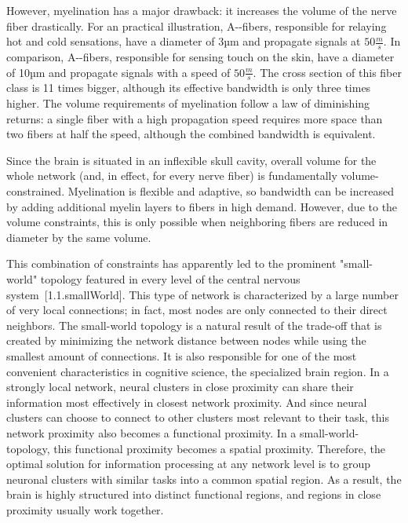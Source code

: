 However, myelination has a major drawback: it increases the volume of the nerve fiber drastically.
For an practical illustration, A-\gamma-fibers, responsible for relaying hot and cold sensations, have a diameter of 3µm and propagate signals at $50\frac{m}{s}$.
In comparison, A-\beta-fibers, responsible for sensing touch on the skin, have a diameter of 10µm and propagate signals with a speed of $50\frac{m}{s}$.
The cross section of this fiber class is 11 times bigger, although its effective bandwidth is only three times higher.
The volume requirements of myelination follow a law of diminishing returns: a single fiber with a high propagation speed requires more space than two fibers at half the speed, although the combined bandwidth is equivalent.

Since the brain is situated in an inflexible skull cavity, overall volume for the whole network (and, in effect, for every nerve fiber) is fundamentally volume-constrained.
Myelination is flexible and adaptive, so bandwidth can be increased by adding additional myelin layers to fibers in high demand.
However, due to the volume constraints, this is only possible when neighboring fibers are reduced in diameter by the same volume.

This combination of constraints has apparently led to the prominent "small-world" topology featured in every level of the central nervous system [1.1.smallWorld].
This type of network is characterized by a large number of very local connections; in fact, most nodes are only connected to their direct neighbors.
The small-world topology is a natural result of the trade-off that is created by minimizing the network distance between nodes while using the smallest amount of connections.
It is also responsible for one of the most convenient characteristics in cognitive science, the specialized brain region.
In a strongly local network, neural clusters in close proximity can share their information most effectively in closest network proximity.
And since neural clusters can choose to connect to other clusters most relevant to their task, this network proximity also becomes a functional proximity.
In a small-world-topology, this functional proximity becomes a spatial proximity.
Therefore, the optimal solution for information processing at any network level is to group neuronal clusters with similar tasks into a common spatial region.
As a result, the brain is highly structured into distinct functional regions, and regions in close proximity usually work together.

